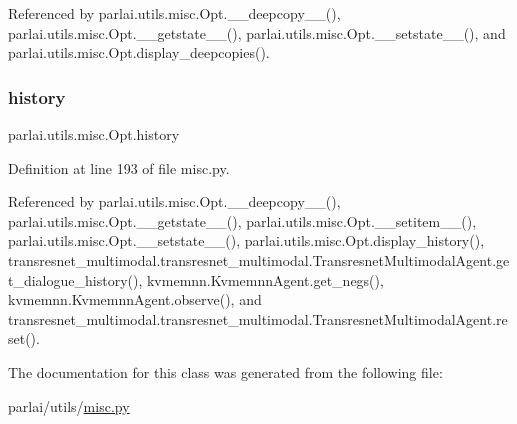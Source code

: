 Referenced by parlai.\+utils.\+misc.\+Opt.\+\_\+\+\_\+deepcopy\+\_\+\+\_\+(), parlai.\+utils.\+misc.\+Opt.\+\_\+\+\_\+getstate\+\_\+\+\_\+(), parlai.\+utils.\+misc.\+Opt.\+\_\+\+\_\+setstate\+\_\+\+\_\+(), and parlai.\+utils.\+misc.\+Opt.\+display\+\_\+deepcopies().

\mbox{\label{classparlai_1_1utils_1_1misc_1_1Opt_a24659f7fa7a137ccd60a139a60d64da2}} 
\subsubsection{\texorpdfstring{history}{history}}
{\footnotesize\ttfamily parlai.\+utils.\+misc.\+Opt.\+history}



Definition at line 193 of file misc.\+py.



Referenced by parlai.\+utils.\+misc.\+Opt.\+\_\+\+\_\+deepcopy\+\_\+\+\_\+(), parlai.\+utils.\+misc.\+Opt.\+\_\+\+\_\+getstate\+\_\+\+\_\+(), parlai.\+utils.\+misc.\+Opt.\+\_\+\+\_\+setitem\+\_\+\+\_\+(), parlai.\+utils.\+misc.\+Opt.\+\_\+\+\_\+setstate\+\_\+\+\_\+(), parlai.\+utils.\+misc.\+Opt.\+display\+\_\+history(), transresnet\+\_\+multimodal.\+transresnet\+\_\+multimodal.\+Transresnet\+Multimodal\+Agent.\+get\+\_\+dialogue\+\_\+history(), kvmemnn.\+Kvmemnn\+Agent.\+get\+\_\+negs(), kvmemnn.\+Kvmemnn\+Agent.\+observe(), and transresnet\+\_\+multimodal.\+transresnet\+\_\+multimodal.\+Transresnet\+Multimodal\+Agent.\+reset().



The documentation for this class was generated from the following file\+:\begin{DoxyCompactItemize}
\item 
parlai/utils/\hyperlink{misc_8py}{misc.\+py}\end{DoxyCompactItemize}
